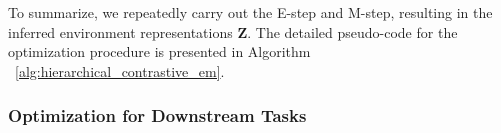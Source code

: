 


To summarize, we repeatedly carry out the E-step and M-step, resulting in the inferred environment representations  $\mathbf{Z}$. The detailed pseudo-code for the optimization procedure is presented in Algorithm ~\ref{alg:hierarchical_contrastive_em}.









\subsubsection{Optimization for Downstream Tasks}

